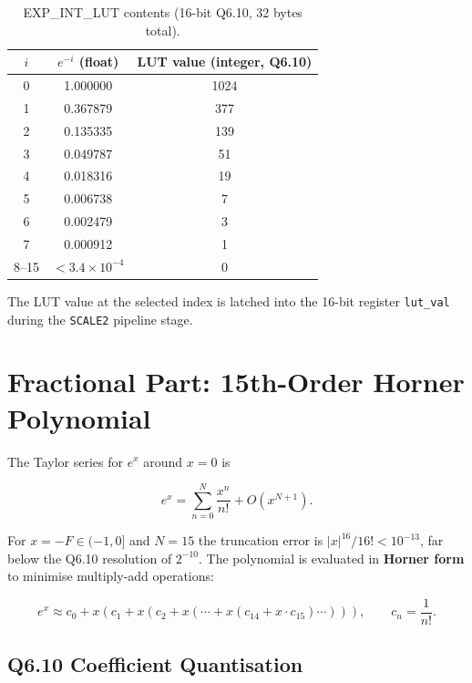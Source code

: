 \documentclass[11pt,a4paper]{article}
\begin{document}
\begin{table}[h]
\centering
\caption{EXP\_INT\_LUT contents (16-bit Q6.10, 32 bytes total).}
\label{tab:lut}
\begin{tabular}{ccc}
\toprule
$i$ & $e^{-i}$ (float) & LUT value (integer, Q6.10) \\
\midrule
0  & 1.000000 & 1024 \\
1  & 0.367879 & 377  \\
2  & 0.135335 & 139  \\
3  & 0.049787 & 51   \\
4  & 0.018316 & 19   \\
5  & 0.006738 & 7    \\
6  & 0.002479 & 3    \\
7  & 0.000912 & 1    \\
8--15 & $< 3.4\times10^{-4}$ & 0 \\
\bottomrule
\end{tabular}
\end{table}

The LUT value at the selected index is latched into the 16-bit register
\texttt{lut\_val} during the \texttt{SCALE2} pipeline stage.

\section{Fractional Part: 15th-Order Horner Polynomial}

The Taylor series for $e^x$ around $x=0$ is

\begin{equation}
  e^x = \sum_{n=0}^{N} \frac{x^n}{n!} + O(x^{N+1}).
  \label{eq:taylor}
\end{equation}

For $x = -F \in (-1, 0]$ and $N = 15$ the truncation error is
$|x|^{16}/16! < 10^{-13}$, far below the Q6.10 resolution of $2^{-10}$.
The polynomial is evaluated in \textbf{Horner form} to minimise multiply-add
operations:

\begin{equation}
  e^x \approx c_0 + x\!\left(c_1 + x\!\left(c_2 + x\!\left(\cdots
              + x\!\left(c_{14} + x\cdot c_{15}\right)\cdots\right)\right)\right),
  \qquad c_n = \frac{1}{n!}.
  \label{eq:horner}
\end{equation}

\subsection{Q6.10 Coefficient Quantisation}
\end{document}
